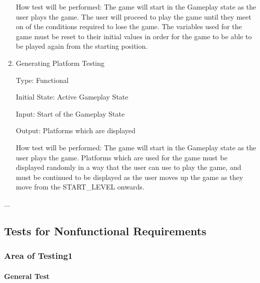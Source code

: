 \documentclass[12pt, titlepage]{article}
\begin{document}
\begin{enumerate}
How test will be performed: The game will start in the Gameplay state as the user plays the game. The user will proceed to play the game until they meet on of the conditions required to lose the game. The variables used for the game must be reset to their initial values in order for the game to be able to be played again from the starting position.

\item{Generating Platform Testing\\}

Type: Functional
					
Initial State: Active Gameplay State
					
Input: Start of the Gameplay State
					
Output: Platforms which are displayed
					
How test will be performed: The game will start in the Gameplay state as the user plays the game. Platforms which are used for the game must be displayed randomly in a way that the user can use to play the game, and must be continued to be displayed as the user moves up the game as they move from the START\_LEVEL onwards.
\end{enumerate}
...

\subsection{Tests for Nonfunctional Requirements}

\subsubsection{Area of Testing1}
		
\paragraph{General Test}
\end{document}
